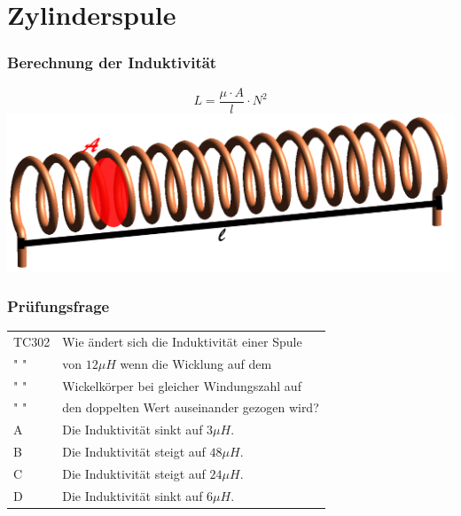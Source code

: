 \section*{Zylinderspule}

\begin{frame}
    \frametitle{Berechnung der Induktivität}
    \begin{center}
      $$L = \frac{\mu \cdot A}{l}\cdot N^2$$
        \includegraphics[width=1\textwidth]{e06/Luftspule.png}
    \end{center}
\end{frame}

\begin{frame}
    \frametitle{Prüfungsfrage}

    \begin{center}
    \begin{tabular}{l||l}\hline
        TC302 & Wie ändert sich die Induktivität einer Spule \\
         " "  & von $12 \mu H$ wenn die Wicklung auf dem \\ 
         " "  & Wickelkörper bei gleicher Windungszahl auf\\
           " "  & den doppelten Wert auseinander gezogen wird? \\\hline\hline
        A & Die Induktivität sinkt auf $3 \mu H$. \\ \hline
        B & Die Induktivität steigt auf $48 \mu H$. \\ \hline
        C & Die Induktivität steigt auf $24 \mu H$. \\ \hline
        D & Die Induktivität sinkt auf $6 \mu H$. \\ \hline
    \end{tabular}
 	    \end{center}
\end{frame}

